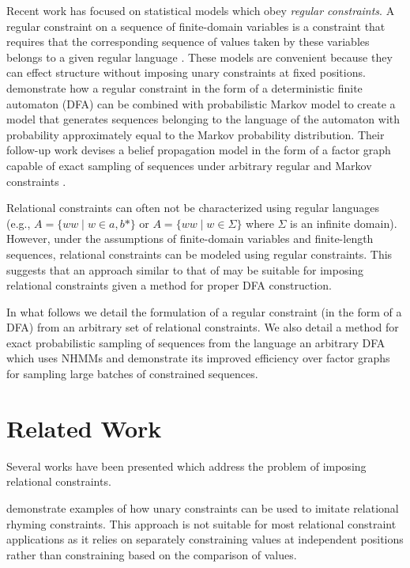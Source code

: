 \documentclass[phd,electronic,oneside,twosidetoc,letterpaper,chaptercenter,parttop,lol,lof,lot]{byumsphd}
\begin{document}
Recent work has focused on statistical models which obey \textit{regular constraints}. A regular constraint on a sequence of finite-domain variables is a constraint that requires that the corresponding sequence of values taken by these variables belongs to a given regular language \cite{pesant2004regular}. These models are convenient because they can effect structure without imposing unary constraints at fixed positions. \cite{papadopoulos2014avoiding} demonstrate how a regular constraint in the form of a deterministic finite automaton (DFA) can be combined with probabilistic Markov model to create a model that generates sequences belonging to the language of the automaton with probability approximately equal to the Markov probability distribution. Their follow-up work devises a belief propagation model in the form of a factor graph capable of exact sampling of sequences under arbitrary regular and Markov constraints \cite{papadopoulos2015exact}.

Relational constraints can often not be characterized using regular languages (e.g.,  $A = \{ww\mid w\in{a,b}*\}$ or $A = \{ww\mid w\in\Sigma\}$ where $\Sigma$ is an infinite domain). However, under the assumptions of finite-domain variables and finite-length sequences, relational constraints can be modeled using regular constraints. This suggests that an approach similar to that of \cite{papadopoulos2015exact} may be suitable for imposing relational constraints given a method for proper DFA construction.

In what follows we detail the formulation of a regular constraint (in the form of a DFA) from an arbitrary set of relational constraints. We also detail a method for exact probabilistic sampling of sequences from the language an arbitrary DFA which uses NHMMs and demonstrate its improved efficiency over factor graphs for sampling large batches of constrained sequences. 

\section{Related Work}

Several works have been presented which address the problem of imposing relational constraints.

\cite{barbieri2012markov} demonstrate examples of how unary constraints can be used to imitate relational rhyming constraints. This approach is not suitable for most relational constraint applications as it relies on separately constraining values at independent positions rather than constraining based on the comparison of values. 
\end{document}
